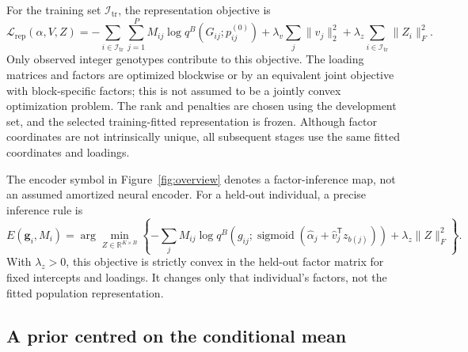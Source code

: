 \documentclass[11pt,a4paper]{article}
\newcommand{\sigmoid}{\operatorname{sigmoid}}
\newcommand{\tr}{\mathrm{tr}}
\begin{document}
For the training set $\mathcal I_{\tr}$, the representation objective is
\begin{equation}
 \mathcal L_{\mathrm{rep}}(\alpha,V,Z)
 =-\sum_{i\in\mathcal I_{\tr}}\sum_{j=1}^{P}
        M_{ij}\log q^B(G_{ij};p^{(0)}_{ij})
   +\lambda_v\sum_j\|v_j\|_2^2
   +\lambda_z\sum_{i\in\mathcal I_{\tr}}\|Z_i\|_F^2.
 \label{eq:repobj}
\end{equation}
Only observed integer genotypes contribute to this objective. The loading
matrices and factors are optimized blockwise or by an equivalent joint
objective with block-specific factors; this is not assumed to be a jointly
convex optimization problem. The rank and penalties are chosen using the
development set, and the selected training-fitted representation is frozen.
Although factor coordinates are not intrinsically unique, all subsequent
stages use the same fitted coordinates and loadings.

The encoder symbol in Figure~\ref{fig:overview} denotes a factor-inference
map, not an assumed amortized neural encoder. For a held-out individual, a
precise inference rule is
\begin{equation}
 E(\mathbf g_i,M_i)
 =\arg\min_{Z\in\mathbb R^{K\times B}}
 \left\{-\sum_j M_{ij}
 \log q^B\!\left(g_{ij};
 \sigmoid(\widehat\alpha_j+\widehat v_j^{\mathsf T}z_{b(j)})\right)
 +\lambda_z\|Z\|_F^2\right\}.
 \label{eq:infer}
\end{equation}
With $\lambda_z>0$, this objective is strictly convex in the held-out factor
matrix for fixed intercepts and loadings. It changes only that individual's
factors, not the fitted population representation.

\subsection{A prior centred on the conditional mean}
\label{sec:prior}
\end{document}
